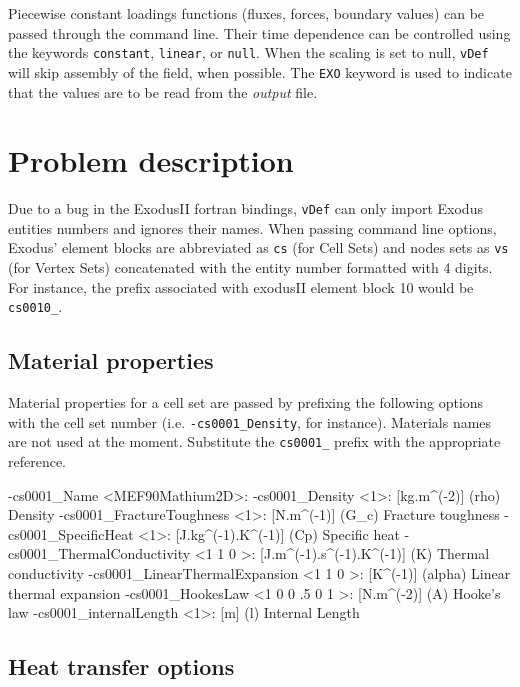 \documentclass[10pt,oneside]{memoir}
\def\vDef{{\texttt{vDef}} }
\begin{document}
Piecewise constant loadings functions (fluxes, forces, boundary values) can be passed through the command line. Their time dependence can be controlled using the keywords \verb+constant+, \verb+linear+, or \verb+null+. When the scaling is set to null, \vDef will skip assembly of the field, when possible. The \verb+EXO+ keyword is used to indicate that the values are to be read from the \emph{output} file.

\section{Problem description}
Due to a bug in the ExodusII fortran bindings, \vDef can only import Exodus entities numbers and ignores their names. When passing command line options, Exodus' element blocks are abbreviated as \verb+cs+ (for Cell Sets) and nodes sets as \verb+vs+ (for Vertex Sets) concatenated with the entity number formatted with 4 digits. For instance, the prefix associated with exodusII element block 10 would be \verb+cs0010_+.

\subsection{Material properties}
Material properties for a cell set are passed by prefixing the following options with the cell set number (i.e. \verb+-cs0001_Density+, for instance). Materials names are not used at the moment. Substitute the \verb+cs0001_+ prefix with the appropriate reference.
\small{
\begin{boxedverbatim}
-cs0001_Name <MEF90Mathium2D>:  
-cs0001_Density <1>: [kg.m^(-2)] (rho) Density 
-cs0001_FractureToughness <1>: [N.m^(-1)] (G_c) Fracture toughness 
-cs0001_SpecificHeat <1>: [J.kg^(-1).K^(-1)] (Cp) Specific heat 
-cs0001_ThermalConductivity <1 1 0 >: [J.m^(-1).s^(-1).K^(-1)] (K) Thermal conductivity 
-cs0001_LinearThermalExpansion <1 1 0 >: [K^(-1)] (alpha) Linear thermal expansion  
-cs0001_HookesLaw <1 0 0 .5 0 1 >: [N.m^(-2)] (A) Hooke's law 
-cs0001_internalLength <1>: [m] (l) Internal Length 
\end{boxedverbatim}
}

\subsection{Heat transfer options}
\end{document}
